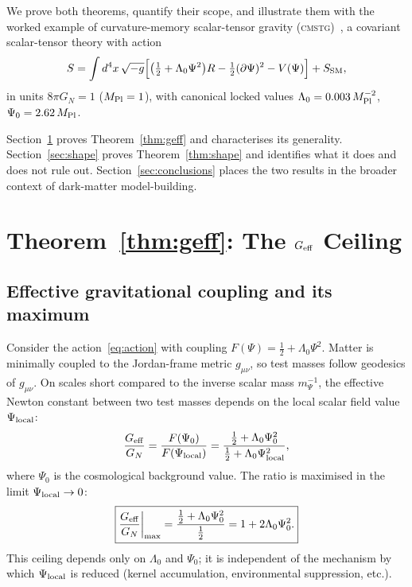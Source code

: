 \documentclass[12pt,a4paper]{article}
\theoremstyle{plain}
\newcommand{\Mpl}{M_{\rm Pl}}
\newcommand{\Geff}{G_{\rm eff}}
\newcommand{\GN}{G_N}
\newcommand{\CMSTG}{\textsc{cmstg}}
\begin{document}
We prove both theorems, quantify their scope, and illustrate them with the
worked example of curvature-memory scalar-tensor gravity
(\CMSTG)~\cite{WilsonPaperIV}, a covariant scalar-tensor theory with
action
\begin{equation}
  S = \int d^4x\,\sqrt{-g}\Bigl[
    \bigl(\tfrac{1}{2}+\Lambda_0\Psi^2\bigr)R
    - \tfrac{1}{2}(\partial\Psi)^2 - V(\Psi)
  \Bigr] + S_{\rm SM},
  \label{eq:action}
\end{equation}
in units $8\pi G_N = 1$ ($\Mpl = 1$), with canonical locked values
$\Lambda_0 = 0.003\,\Mpl^{-2}$, $\Psi_0 = 2.62\,\Mpl$.

Section~\ref{sec:geff} proves Theorem~\ref{thm:geff} and characterises its
generality. Section~\ref{sec:shape} proves Theorem~\ref{thm:shape} and
identifies what it does and does not rule out.
Section~\ref{sec:conclusions} places the two results in the broader context
of dark-matter model-building.

\section{Theorem~\ref{thm:geff}: The \texorpdfstring{$G_{\rm eff}$}{Geff} Ceiling}
\label{sec:geff}

\subsection{Effective gravitational coupling and its maximum}
\label{sec:geff_setup}

Consider the action~\eqref{eq:action} with coupling $F(\Psi) = \tfrac{1}{2}
+ \Lambda_0\Psi^2$.  Matter is minimally coupled to the Jordan-frame
metric $g_{\mu\nu}$, so test masses follow geodesics of $g_{\mu\nu}$.
On scales short compared to the inverse scalar mass $m_\Psi^{-1}$, the
effective Newton constant between two test masses depends on the local
scalar field value $\Psi_{\rm local}$:
\begin{equation}
  \frac{\Geff}{\GN} = \frac{F(\Psi_0)}{F(\Psi_{\rm local})}
    = \frac{\tfrac{1}{2}+\Lambda_0\Psi_0^2}{\tfrac{1}{2}+\Lambda_0\Psi_{\rm local}^2},
  \label{eq:geff}
\end{equation}
where $\Psi_0$ is the cosmological background value.  The ratio is
maximised in the limit $\Psi_{\rm local} \to 0$:
\begin{equation}
  \boxed{
  \frac{\Geff}{\GN}\bigg|_{\rm max}
    = \frac{\tfrac{1}{2}+\Lambda_0\Psi_0^2}{\tfrac{1}{2}}
    = 1 + 2\Lambda_0\Psi_0^2.
  }
  \label{eq:ceiling}
\end{equation}
This ceiling depends only on $\Lambda_0$ and $\Psi_0$; it is independent
of the mechanism by which $\Psi_{\rm local}$ is reduced (kernel
accumulation, environmental suppression, etc.).
\end{document}
